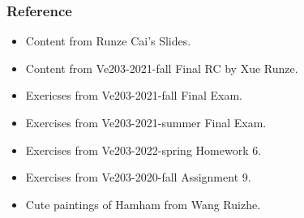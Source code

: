 \documentclass{beamer}
\begin{document}
\begin{frame}
    \frametitle{Reference}
    \begin{itemize}
        \item Content from Runze Cai's Slides.
        \item Content from Ve203-2021-fall Final RC by Xue Runze.
        \item Exericses from Ve203-2021-fall Final Exam.
        \item Exercises from Ve203-2021-summer Final Exam.
        \item Exercises from Ve203-2022-spring Homework 6.
        \item Exercises from Ve203-2020-fall Assignment 9.
        \item Cute paintings of Hamham from Wang Ruizhe.
    \end{itemize}
\end{frame}
\end{document}
